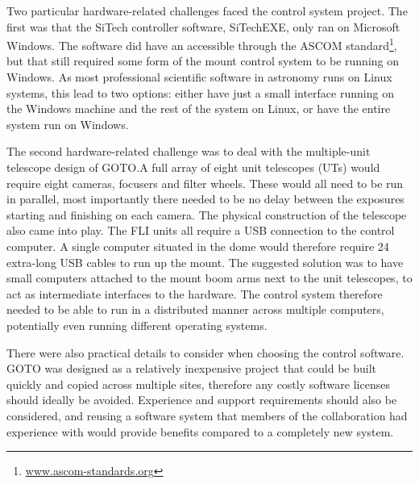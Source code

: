 \begin{colsection}
Two particular hardware-related challenges faced the control system project. The first was that the SiTech controller software, SiTechEXE, only ran on Microsoft Windows. The software did have an accessible  through the ASCOM standard\footnote{\url{www.ascom-standards.org}}, but that still required some form of the mount control system to be running on Windows. As most professional scientific software in astronomy runs on Linux systems, this lead to two options: either have just a small interface running on the Windows machine and the rest of the system on Linux, or have the entire system run on Windows.

The second hardware-related challenge was to deal with the multiple-unit telescope design of GOTO.\@ A full array of eight unit telescopes (UTs) would require eight cameras, focusers and filter wheels. These would all need to be run in parallel, most importantly there needed to be no delay between the exposures starting and finishing on each camera. The physical construction of the telescope also came into play. The FLI units all require a USB connection to the control computer. A single computer situated in the dome would therefore require 24 extra-long USB cables to run up the mount. The suggested solution was to have small computers attached to the mount boom arms next to the unit telescopes, to act as intermediate interfaces to the hardware. The control system therefore needed to be able to run in a distributed manner across multiple computers, potentially even running different operating systems.

There were also practical details to consider when choosing the control software. GOTO was designed as a relatively inexpensive project that could be built quickly and copied across multiple sites, therefore any costly software licenses should ideally be avoided. Experience and support requirements should also be considered, and reusing a software system that members of the collaboration had experience with would provide benefits compared to a completely new system.

\end{colsection}


